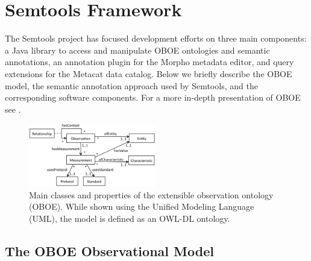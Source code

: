 
\section{Semtools Framework}
\label{sec:framework}

The Semtools project has focused development efforts on three main
components: a Java library to access and manipulate OBOE ontologies
and semantic annotations, an annotation plugin for the Morpho metadata
editor, and query extensions for the Metacat data catalog. Below we
briefly describe the OBOE model, the semantic annotation approach used
by Semtools, and the corresponding software components. For a more
in-depth presentation of OBOE see
\cite{madin07:_ontol_for_descr_and_synth,bowers08}.

\begin{figure}[!t]
  \centering
  \includegraphics[width=0.494\textwidth]{images/oboe}
  \caption{Main classes and properties of the extensible observation
    ontology (OBOE). While shown using the Unified Modeling Language (UML),
    the model is defined as an OWL-DL ontology.}
  \label{fig:oboe}
  \vspace{-12pt}
\end{figure}

\subsection{The OBOE Observational Model}  

